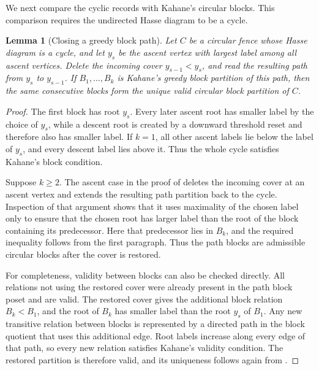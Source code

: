 \documentclass[11pt,letterpaper,reqno]{amsart}
\newtheorem{lemma}[theorem]{Lemma}
\theoremstyle{definition}
\begin{document}
We next compare the cyclic records with Kahane's circular blocks.  This
comparison requires the undirected Hasse diagram to be a cycle.

\begin{lemma}[Closing a greedy block path]
\label{lem:closing-greedy-blocks}
Let \(C\) be a circular fence whose Hasse diagram is a cycle, and let \(y_s\)
be the ascent vertex with largest label among all ascent vertices.  Delete
the incoming cover \(y_{s-1}<y_s\), and read the resulting path from \(y_s\)
to \(y_{s-1}\).  If \(B_1,\ldots,B_k\) is Kahane's greedy block partition of
this path, then the same consecutive blocks form the unique valid circular
block partition of \(C\).
\end{lemma}

\begin{proof}
The first block has root \(y_s\).  Every later ascent root has smaller label
by the choice of \(y_s\), while a descent root is created by a downward
threshold reset and therefore also has smaller label.  If \(k=1\), all other
ascent labels lie below the label of \(y_s\), and every descent label lies
above it.  Thus the whole cycle satisfies Kahane's block condition.

Suppose \(k\ge2\).  The ascent case in the proof of
\cite[Lemma~4.7]{Kahane} deletes the incoming cover at an ascent vertex and
extends the resulting path partition back to the cycle.  Inspection of that
argument shows that it uses maximality of the chosen label only to ensure that
the chosen root has larger label than the root of the block containing its
predecessor.  Here that predecessor lies in \(B_k\), and the required
inequality follows from the first paragraph.  Thus the path blocks are
admissible circular blocks after the cover is restored.

For completeness, validity between blocks can also be checked directly.  All
relations not using the restored cover were already present in the path block
poset and are valid.  The restored cover gives the additional block relation
\(B_k<B_1\), and the root of \(B_k\) has smaller label than the root \(y_s\) of
\(B_1\).  Any new transitive relation between blocks is represented by a
directed path in the block quotient that uses this additional edge.  Root
labels increase along every edge of that path, so every new relation satisfies
Kahane's validity condition.  The restored partition is therefore valid, and
its uniqueness follows again from \cite[Lemma~4.7]{Kahane}.
\end{proof}
\end{document}
